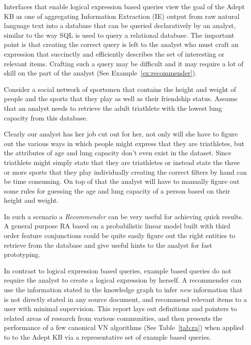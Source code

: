 \documentclass[paper=a4,fontsize=11pt]{scrartcl}
\newcommand{\Tabref}[1]{Table~\ref{#1}}
\newcommand{\Exref}[1]{Example~\ref{#1}}
\numberwithin{equation}{section}    %
\numberwithin{figure}{section}      %
\numberwithin{table}{section}       %
\begin{document}
Interfaces that enable logical expression based queries view the goal of the
Adept KB as one of aggregating Information Extraction (IE) output from raw
natural language text into a database that can be queried declaratively by an
analyst, similar to the way SQL is used to query a relational database.
The important point is that creating the correct query is left to the analyst
who must craft an expression that succinctly and
efficiently describes the set of interesting or relevant items. Crafting
such a query may be difficult and it may require a lot of skill on the part of the
analyst (See \Exref{ex:recommender}).
\begin{example}\label{ex:recommender}
  Consider a social network of sportsmen that contains the height
  and weight of people and the sports that they play as well as their friendship
  status. Assume that an analyst needs to retrieve the adult triathlete
  with the lowest lung capacity from this database.

  Clearly our analyst has her job cut out for her, not only will she have to
  figure out the various ways in which people might express that they are
  triathletes, but the attributes of age and lung capacity don't even exist in
  the dataset. Since triathlete might simply state that they are triathletes or
  instead state the three or more sports that they play individually creating
  the correct filters by hand can be time consuming. On top of that the analyst
  will have to manually figure out some rules for guessing the age and lung capacity of
  a person  based on their height and weight.

  In such a scenario a \textit{Recommender} can be very useful for achieving quick
  results. A general purpose RA based on a probabilistic linear model built with
  third order feature conjunctions could be quite easily figure out the right
  entities to retrieve from the database and give useful hints to the analyst
  for fast prototyping.
\end{example}
In contrast to logical expression based queries,
example based queries do not require the analyst to create a
logical expression by herself. A recommender can use the information stated
in the knowledge graph to infer \textit{new} information that is not
directly stated in
any source document, and recommend relevant items to a user with
minimal supervision. This report lays out definitions and pointers to related areas of
research from various communities, and then presents the performance of
a few canonical VN algorithms (See \Tabref{tab:ra}) when applied to to the Adept
KB via a representative set of example based queries.
\end{document}
